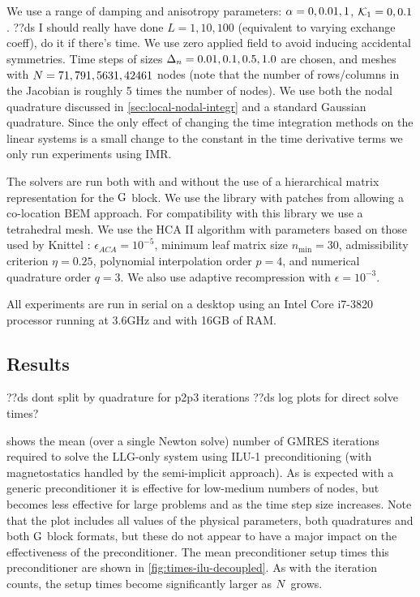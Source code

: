 We use a range of damping and anisotropy parameters: $\alpha = 0, 0.01, 1$, $\mathcal{K}_1 = 0, 0.1$. ??ds I should really have done $L=1,10,100$ (equivalent to varying exchange coeff), do it if there's time.
We use zero applied field to avoid inducing accidental symmetries.
Time steps of sizes $\Delta_{n} = 0.01, 0.1, 0.5, 1.0$ are chosen, and meshes with $N= 71, 791, 5631, 42461$ nodes (note that the number of rows/columns in the Jacobian is roughly 5 times the number of nodes).
We use both the nodal quadrature discussed in \cref{sec:local-nodal-integr} and a standard Gaussian quadrature.
Since the only effect of changing the time integration methods on the linear systems is a small change to the constant in the time derivative terms we only run experiments using IMR.

The solvers are run both with and without the use of a hierarchical matrix representation for the $\mathrm{G}$ block.
We use the \hlib library with patches from \nmag allowing a co-location BEM approach.
For compatibility with this library we use a tetrahedral mesh.
We use the HCA II algorithm with parameters based on those used by Knittel \cite{Knittel2011}:
$\epsilon_{ACA} = 10^{-5}$,
minimum leaf matrix size $n_{\text{min}}= 30$,
admissibility criterion $\eta = 0.25$,
polynomial interpolation order $p=4$, and
numerical quadrature order $q=3$.
We also use adaptive recompression with $\epsilon = 10^{-3}$.

All experiments are run in serial on a desktop using an Intel Core i7-3820 processor running at 3.6GHz and with 16GB of RAM.


\subsection{Results}

??ds dont split by quadrature for p2p3 iterations
??ds log plots for direct solve times?

 shows the mean (over a single Newton solve) number of GMRES iterations required to solve the LLG-only system using ILU-1 preconditioning (\ie with magnetostatics handled by the semi-implicit approach).
As is expected with a generic preconditioner it is effective for low-medium numbers of nodes, but becomes less effective for large problems and as the time step size increases.
Note that the plot includes all values of the physical parameters, both quadratures and both $\mathrm{G}$ block formats, but these do not appear to have a major impact on the effectiveness of the preconditioner.
The mean preconditioner setup times this preconditioner are shown in \cref{fig:times-ilu-decoupled}.
As with the iteration counts, the setup times become significantly larger as $N$ grows.

